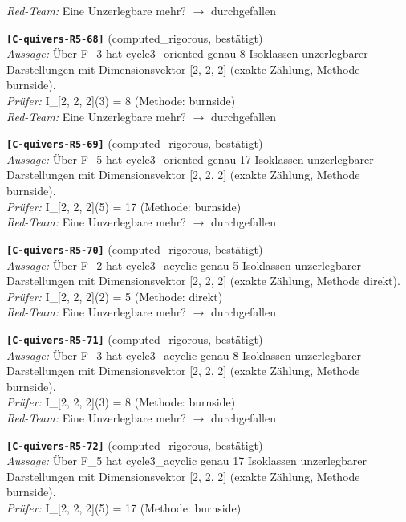 \documentclass[11pt]{article}
\theoremstyle{definition}\newtheorem{definition}[theorem]{Definition}\newtheorem{remark}[theorem]{Remark}\newtheorem{observation}[theorem]{Numerical observation}
\begin{document}
\textit{Red-Team:} Eine Unzerlegbare mehr? $\to$ durchgefallen\par\medskip
\noindent\textbf{\texttt{[C-quivers-R5-68]}} (computed\_rigorous, bestätigt)\\
\textit{Aussage:} Über F\_3 hat cycle3\_oriented genau 8 Isoklassen unzerlegbarer Darstellungen mit Dimensionsvektor [2, 2, 2] (exakte Zählung, Methode burnside).\\
\textit{Prüfer:} I\_[2, 2, 2](3) = 8 (Methode: burnside)\\
\textit{Red-Team:} Eine Unzerlegbare mehr? $\to$ durchgefallen\par\medskip
\noindent\textbf{\texttt{[C-quivers-R5-69]}} (computed\_rigorous, bestätigt)\\
\textit{Aussage:} Über F\_5 hat cycle3\_oriented genau 17 Isoklassen unzerlegbarer Darstellungen mit Dimensionsvektor [2, 2, 2] (exakte Zählung, Methode burnside).\\
\textit{Prüfer:} I\_[2, 2, 2](5) = 17 (Methode: burnside)\\
\textit{Red-Team:} Eine Unzerlegbare mehr? $\to$ durchgefallen\par\medskip
\noindent\textbf{\texttt{[C-quivers-R5-70]}} (computed\_rigorous, bestätigt)\\
\textit{Aussage:} Über F\_2 hat cycle3\_acyclic genau 5 Isoklassen unzerlegbarer Darstellungen mit Dimensionsvektor [2, 2, 2] (exakte Zählung, Methode direkt).\\
\textit{Prüfer:} I\_[2, 2, 2](2) = 5 (Methode: direkt)\\
\textit{Red-Team:} Eine Unzerlegbare mehr? $\to$ durchgefallen\par\medskip
\noindent\textbf{\texttt{[C-quivers-R5-71]}} (computed\_rigorous, bestätigt)\\
\textit{Aussage:} Über F\_3 hat cycle3\_acyclic genau 8 Isoklassen unzerlegbarer Darstellungen mit Dimensionsvektor [2, 2, 2] (exakte Zählung, Methode burnside).\\
\textit{Prüfer:} I\_[2, 2, 2](3) = 8 (Methode: burnside)\\
\textit{Red-Team:} Eine Unzerlegbare mehr? $\to$ durchgefallen\par\medskip
\noindent\textbf{\texttt{[C-quivers-R5-72]}} (computed\_rigorous, bestätigt)\\
\textit{Aussage:} Über F\_5 hat cycle3\_acyclic genau 17 Isoklassen unzerlegbarer Darstellungen mit Dimensionsvektor [2, 2, 2] (exakte Zählung, Methode burnside).\\
\textit{Prüfer:} I\_[2, 2, 2](5) = 17 (Methode: burnside)\\
\end{document}
